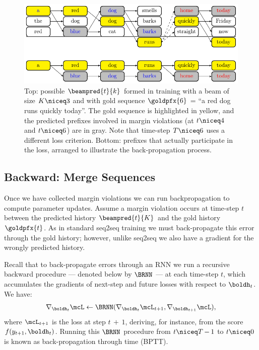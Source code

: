 \begin{figure}[t!]
\centering
\includegraphics[width=1\columnwidth]{beam}
\caption{Top: possible $\beampred{t}{k}$ formed in training with a beam of size $K \niceq 3$ and with gold sequence $\goldpfx{6}$ = ``a red dog runs quickly today''. The gold sequence is highlighted in yellow, and the predicted prefixes involved in margin violations (at $t \niceq 4$ and $t \niceq 6$) are in gray. Note that time-step $T \niceq 6$ uses a different loss criterion. Bottom: prefixes that actually participate in the loss, arranged to illustrate the back-propagation process.}
\label{fig:backprop}
\end{figure}


\subsection{Backward: Merge Sequences}
Once we have collected margin violations we can run backpropagation to compute parameter updates. Assume a
margin violation occurs at time-step $t$ between the predicted history
$\beampred{t}{K}$ and the gold history $\goldpfx{t}$. As in standard
seq2seq training we must back-propagate this error through the gold
history; however, unlike seq2seq we also have a gradient for the
wrongly predicted history.

Recall that to back-propagate errors through an RNN we run a recursive backward procedure --- denoted below by $\BRNN$ --- at each time-step $t$, which accumulates the 
gradients of next-step and future losses with respect to $\boldh_t$. We have: 
\begin{align*}
\nabla_{\boldh_t} \mcL \gets \BRNN(\nabla_{\boldh_t} \mcL_{t+1},\nabla_{\boldh_{t+1}} \mcL),
\end{align*} 
where $\mcL_{t+1}$ is the loss at step $t \, {+} \, 1$, deriving, for instance, from the score $f(y_{t+1}, \boldh_{t})$.
Running this $\BRNN$ procedure from $t \niceq T \, {-} \,1$ to $t \niceq 0$ is known as back-propagation through time (BPTT).

